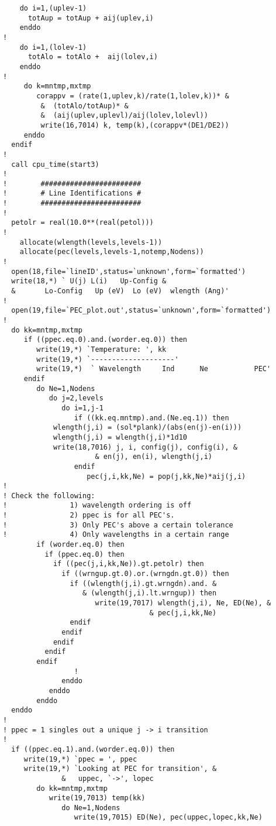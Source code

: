 \begin{appendices}
\begin{verbatim}
    do i=1,(uplev-1)
      totAup = totAup + aij(uplev,i)
    enddo
!
    do i=1,(lolev-1)
      totAlo = totAlo +  aij(lolev,i)
    enddo
!
     do k=mntmp,mxtmp
        corappv = (rate(1,uplev,k)/rate(1,lolev,k))* &
         &  (totAlo/totAup)* &
         &  (aij(uplev,uplevl)/aij(lolev,lolevl))
         write(16,7014) k, temp(k),(corappv*(DE1/DE2))
     enddo
  endif
!
  call cpu_time(start3)
!
!        ########################
!        # Line Identifications #
!        ########################
!
  petolr = real(10.0**(real(petol)))
!
    allocate(wlength(levels,levels-1))
    allocate(pec(levels,levels-1,notemp,Nodens))
!
  open(18,file=`lineID',status=`unknown',form=`formatted')
  write(18,*) ` U(j) L(i)   Up-Config &
  &       Lo-Config   Up (eV)  Lo (eV)  wlength (Ang)'
!
  open(19,file=`PEC_plot.out',status=`unknown',form=`formatted')
!
  do kk=mntmp,mxtmp
     if ((ppec.eq.0).and.(worder.eq.0)) then
        write(19,*) `Temperature: ', kk
        write(19,*) `--------------------'
        write(19,*)  ` Wavelength     Ind      Ne           PEC'
     endif
        do Ne=1,Nodens
           do j=2,levels
              do i=1,j-1
                 if ((kk.eq.mntmp).and.(Ne.eq.1)) then
            wlength(j,i) = (sol*plank)/(abs(en(j)-en(i)))
            wlength(j,i) = wlength(j,i)*1d10
            write(18,7016) j, i, config(j), config(i), &
                      & en(j), en(i), wlength(j,i)
                 endif
                    pec(j,i,kk,Ne) = pop(j,kk,Ne)*aij(j,i)
!
! Check the following:
!               1) wavelength ordering is off
!               2) ppec is for all PEC's.
!               3) Only PEC's above a certain tolerance
!               4) Only wavelengths in a certain range
        if (worder.eq.0) then
          if (ppec.eq.0) then
            if ((pec(j,i,kk,Ne)).gt.petolr) then
              if ((wrngup.gt.0).or.(wrngdn.gt.0)) then
                if ((wlength(j,i).gt.wrngdn).and. &
                   & (wlength(j,i).lt.wrngup)) then
                      write(19,7017) wlength(j,i), Ne, ED(Ne), &
                                   & pec(j,i,kk,Ne)
                endif
              endif
            endif
          endif
        endif
                 !
              enddo
           enddo
        enddo
  enddo
!
! ppec = 1 singles out a unique j -> i transition
!
  if ((ppec.eq.1).and.(worder.eq.0)) then
     write(19,*) `ppec = ', ppec
     write(19,*) `Looking at PEC for transition', &
              &   uppec, `->', lopec
        do kk=mntmp,mxtmp
           write(19,7013) temp(kk)
              do Ne=1,Nodens
                 write(19,7015) ED(Ne), pec(uppec,lopec,kk,Ne)

\end{verbatim}
\end{appendices}

